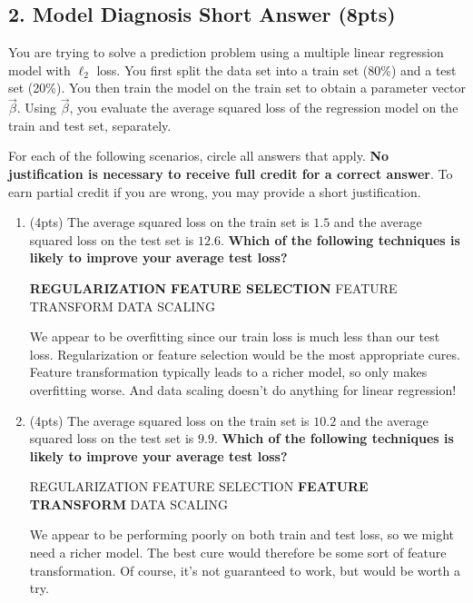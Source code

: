 \documentclass[10pt]{article}
\begin{document}
\subsection{2. Model Diagnosis Short Answer (\textbf{\small 8pts})}
You are trying to solve a prediction problem using a multiple linear regression model with $\ell_2$ loss. 
You first split the data set into a train set (80\%) and a test set (20\%). You then train the model on the train set to obtain a parameter vector $\vec{\beta}$. Using $\vec{\beta}$, you evaluate the average squared loss of the regression model on the train and test set, separately.


For each of the following scenarios, circle all answers that apply.  \textbf{No justification is necessary to receive full credit for a correct answer}. To earn partial credit if you are wrong, you may provide a short justification.
\begin{enumerate}[label=(\alph*)]
	\item  (4pts) The average squared loss on the train set is $1.5$ and the average squared loss on the test set is $12.6$. \textbf{Which of the following techniques is likely to improve your average test loss?} 
	
	\vspace{1em}\textbf{REGULARIZATION}\hspace{.25em} \textbf{FEATURE SELECTION}\hspace{.25em} FEATURE TRANSFORM \hspace{.25em} DATA SCALING
	
	\vspace{1em}
	\color{blue}
	We appear to be overfitting since our train loss is much less than our test loss. Regularization or feature selection would be the most appropriate cures. Feature transformation typically leads to a richer model, so only makes overfitting worse. And data scaling doesn't do anything for linear regression! 
	\color{black}
	\vspace{1em}

	
	\item (4pts) The average squared loss on the train set is $10.2$ and the average squared loss on the test set is $9.9$. \textbf{Which of the following techniques is likely to improve your average test loss?}
	
	\vspace{1em}REGULARIZATION\hspace{.25em} {FEATURE SELECTION}\hspace{.25em} \textbf{FEATURE TRANSFORM} \hspace{.25em} DATA SCALING
	
	\vspace{1em}
	\color{blue}
	We appear to be performing poorly on both train and test loss, so we might need a richer model. The best cure would therefore be some sort of feature transformation. Of course, it's not guaranteed to work, but would be worth a try.
	\color{black}
	\vspace{1em}
	
	

\end{enumerate}
\end{document}
